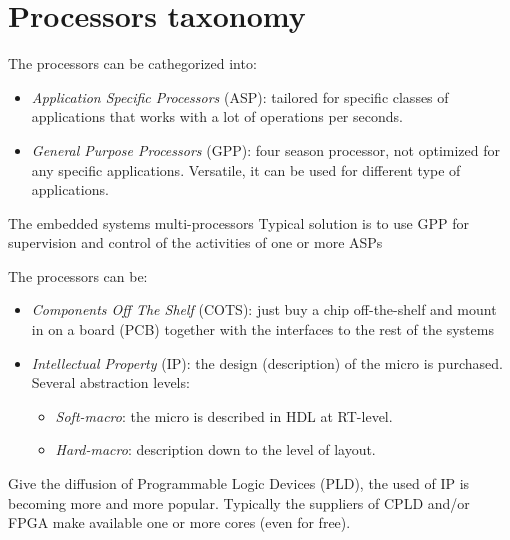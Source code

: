 \section{Processors taxonomy}

The processors can be cathegorized into: 
\begin{itemize}
    \item \textit{Application Specific Processors} (ASP): tailored for specific classes of applications that works with a lot of operations per seconds.
    \item \textit{General Purpose Processors} (GPP): four season processor, not optimized for any specific applications.
        Versatile, it can be used for different type of applications.
\end{itemize}
The embedded systems multi-processors Typical solution is to use GPP for supervision and control of the
activities of one or more ASPs

The processors can be: 
\begin{itemize}
    \item \textit{Components Off The Shelf} (COTS): just buy a chip off-the-shelf and mount in on a board (PCB) together with the interfaces to the rest of the systems
    \item \textit{Intellectual Property} (IP): the design (description) of the micro is purchased. 
        Several abstraction levels: 
        \begin{itemize}
            \item \textit{Soft-macro}: the micro is described in HDL at RT-level.
            \item \textit{Hard-macro}: description down to the level of layout.
        \end{itemize} 
\end{itemize}
Give the diffusion of Programmable Logic Devices (PLD), the used of IP is becoming more and more popular.
Typically the suppliers of CPLD and/or FPGA make available one or more cores (even for free). 


